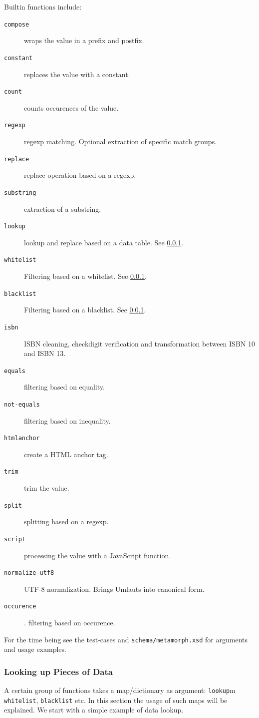 \documentclass[12pt,a4paper]{article}
\begin{document}
Builtin functions include:
\begin{description}
\item[{\tt compose}] wraps the value in a prefix and postfix.
\item[{\tt constant}] replaces the value with a constant.
\item[{\tt count}] counts occurences of the value.
\item[{\tt regexp}] regexp matching. Optional extraction of specific match groups.
 \item[{\tt replace}] replace operation based on a regexp.
\item[{\tt substring}] extraction of a substring.
\item[{\tt lookup}] lookup and replace based on a data table. See \ref{lookup}.
\item[{\tt whitelist}] Filtering based on a whitelist. See \ref{lookup}.
 \item[{\tt blacklist}] Filtering based on a blacklist. See \ref{lookup}.
 \item[{\tt isbn}] ISBN cleaning, checkdigit verification and transformation between ISBN 10 and ISBN 13.
 \item[{\tt equals}] filtering based on equality.
\item[{\tt not-equals}] filtering based on inequality.
 \item[{\tt htmlanchor}] create a HTML anchor tag.
 \item[{\tt trim}] trim the value.
 \item[{\tt split}] splitting based on a regexp.
 \item[{\tt script}] processing the value with a JavaScript function.
 \item[{\tt normalize-utf8}]  UTF-8 normalization. Brings Umlauts into canonical form.
\item[{\tt occurence}]. filtering based on occurence.
\end{description}

For the time being see the test-cases and {\tt schema/metamorph.xsd} for arguments and usage examples.



\subsubsection{Looking up  Pieces of Data}\label{lookup}

A certain group of functions takes a map/dictionary as argument: {\tt lookup}m {\tt whitelist}, {\tt blacklist} etc.
In this section the usage of such maps will be explained. We start with a simple example of data lookup.
\end{document}
